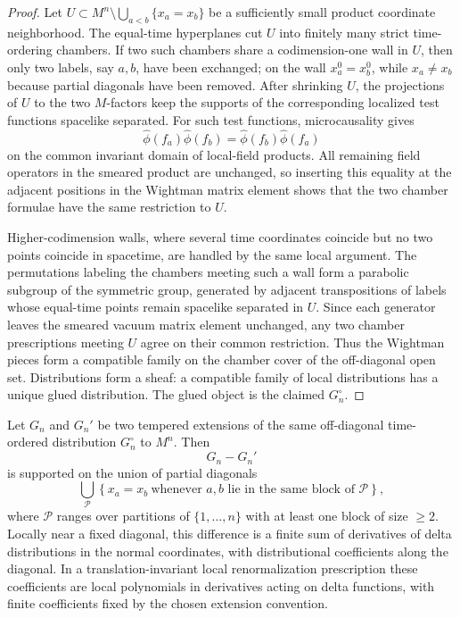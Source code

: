 \begin{proof}
Let \(U\subset M^n\setminus\bigcup_{a<b}\{x_a=x_b\}\) be a sufficiently small
product coordinate neighborhood.  The equal-time hyperplanes cut \(U\) into
finitely many strict time-ordering chambers.  If two such chambers share a
codimension-one wall in \(U\), then only two labels, say \(a,b\), have been
exchanged; on the wall \(x_a^0=x_b^0\), while \(x_a\neq x_b\) because
partial diagonals have been removed.  After shrinking \(U\), the projections
of \(U\) to the two \(M\)-factors keep the supports of the corresponding
localized test functions spacelike separated.  For such test functions,
microcausality gives
\[
  \widehat\phi(f_a)\widehat\phi(f_b)
  =
  \widehat\phi(f_b)\widehat\phi(f_a)
\]
on the common invariant domain of local-field products.  All remaining field
operators in the smeared product are unchanged, so inserting this equality at
the adjacent positions in the Wightman matrix element shows that the two
chamber formulae have the same restriction to \(U\).

Higher-codimension walls, where several time coordinates coincide but no two
points coincide in spacetime, are handled by the same local argument.  The
permutations labeling the chambers meeting such a wall form a parabolic
subgroup of the symmetric group, generated by adjacent transpositions of
labels whose equal-time points remain spacelike separated in \(U\).  Since
each generator leaves the smeared vacuum matrix element unchanged, any two
chamber prescriptions meeting \(U\) agree on their common restriction.  Thus
the Wightman pieces form a compatible family on the chamber cover of the
off-diagonal open set.  Distributions form a sheaf: a compatible family of
local distributions has a unique glued distribution.  The glued object is
the claimed \(G_n^\circ\).
\end{proof}

\begin{proposition}
\label{prop:time-ordered-extension-contact-term-freedom}
Let \(G_n\) and \(G_n'\) be two tempered extensions of the same off-diagonal
time-ordered distribution \(G_n^\circ\) to \(M^n\).  Then
\[
  G_n-G_n'
\]
is supported on the union of partial diagonals
\[
  \bigcup_{\mathcal P}
  \left\{x_a=x_b\ \text{whenever \(a,b\) lie in the same block of }
  \mathcal P\right\},
\]
where \(\mathcal P\) ranges over partitions of \(\{1,\ldots,n\}\) with at
least one block of size \(\ge2\).  Locally near a fixed diagonal, this
difference is a finite sum of derivatives of delta distributions in the
normal coordinates, with distributional coefficients along the diagonal.  In a
translation-invariant local renormalization prescription these coefficients
are local polynomials in derivatives acting on delta functions, with finite
coefficients fixed by the chosen extension convention.
\end{proposition}

